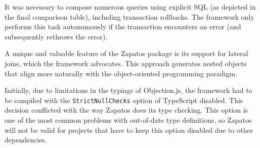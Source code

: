 It was necessary to compose numerous queries using explicit SQL (as depicted in
the final comparison table), including transaction rollbacks. The framework only
performs this task autonomously if the transaction encounters an error (and
subsequently rethrows the error).

A unique and valuable feature of the Zapatos package is its support for lateral
joins, which the framework advocates. This approach generates nested objects
that align more naturally with the object-oriented programming paradigm.

Initially, due to limitations in the typings of Objection.js, the framework had
to be compiled with the \texttt{StrictNullChecks} option of TypeScript disabled. This
decision conflicted with the way Zapatos does its type checking. This option is
one of the most common problems with out-of-date type definitions, so Zapatos
will not be valid for projects that have to keep this option disabled due to
other dependencies.